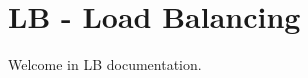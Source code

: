 \chapter{LB -\/ Load Balancing }
\hypertarget{md__2LB_2docs_2md_2overview}{}\label{md__2LB_2docs_2md_2overview}
\label{md__2LB_2docs_2md_2overview_autotoc_md0}%
%


Welcome in LB documentation. 